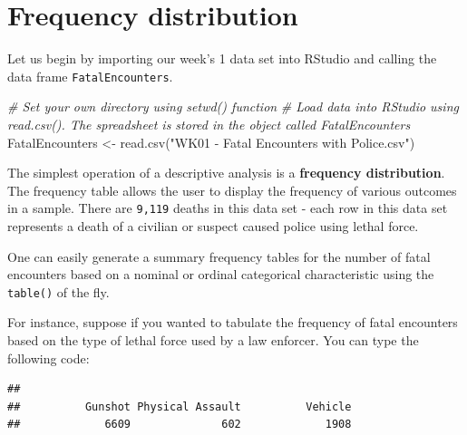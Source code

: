 \documentclass[
]{book}
\newenvironment{Shaded}{\begin{snugshade}}{\end{snugshade}}
\newcommand{\CommentTok}[1]{\textcolor[rgb]{0.56,0.35,0.01}{\textit{#1}}}
\newcommand{\FunctionTok}[1]{\textcolor[rgb]{0.00,0.00,0.00}{#1}}
\newcommand{\NormalTok}[1]{#1}
\newcommand{\OtherTok}[1]{\textcolor[rgb]{0.56,0.35,0.01}{#1}}
\newcommand{\SpecialCharTok}[1]{\textcolor[rgb]{0.00,0.00,0.00}{#1}}
\newcommand{\StringTok}[1]{\textcolor[rgb]{0.31,0.60,0.02}{#1}}
\begin{document}
\hypertarget{frequency-distribution}{%
\section{Frequency distribution}\label{frequency-distribution}}

Let us begin by importing our week's 1 data set into RStudio and calling the data frame \texttt{FatalEncounters}.

\begin{Shaded}
\begin{Highlighting}[]
\CommentTok{\# Set your own directory using setwd() function}
\CommentTok{\# Load data into RStudio using read.csv(). The spreadsheet is stored in the object called \textquotesingle{}FatalEncounters\textquotesingle{}}
\NormalTok{FatalEncounters }\OtherTok{\textless{}{-}} \FunctionTok{read.csv}\NormalTok{(}\StringTok{"WK01 {-} Fatal Encounters with Police.csv"}\NormalTok{)}
\end{Highlighting}
\end{Shaded}

The simplest operation of a descriptive analysis is a \textbf{frequency distribution}. The frequency table allows the user to display the frequency of various outcomes in a sample. There are \texttt{9,119} deaths in this data set - each row in this data set represents a death of a civilian or suspect caused police using lethal force.

One can easily generate a summary frequency tables for the number of fatal encounters based on a nominal or ordinal categorical characteristic using the \texttt{table()} of the fly.

For instance, suppose if you wanted to tabulate the frequency of fatal encounters based on the type of lethal force used by a law enforcer. You can type the following code:

\begin{Shaded}
\end{Shaded}

\begin{verbatim}
## 
##          Gunshot Physical Assault          Vehicle 
##             6609              602             1908
\end{verbatim}
\end{document}
